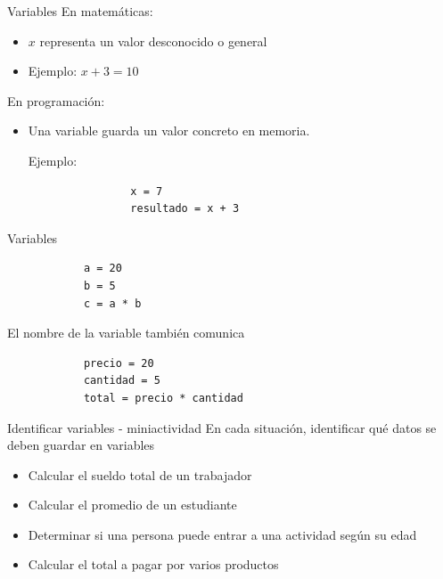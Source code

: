 \documentclass{beamer}
\begin{document}
    \begin{frame}[fragile,t]{Variables}
        En matemáticas:
        \begin{itemize}
            \item $x$ representa un valor desconocido o general
            \item Ejemplo: $x + 3 = 10$
        \end{itemize}
        En programación:
        \begin{itemize}
            \item Una variable guarda un valor concreto en memoria.
            
            Ejemplo:
            
            \begin{verbatim}
                x = 7
                resultado = x + 3
            \end{verbatim}
        \end{itemize}
    \end{frame}

    \begin{frame}[fragile,t]{Variables}
        \begin{verbatim}
            a = 20
            b = 5
            c = a * b
        \end{verbatim}
        
        El nombre de la variable también comunica
        
        \begin{verbatim}
            precio = 20
            cantidad = 5
            total = precio * cantidad
        \end{verbatim}
    \end{frame}

    \begin{frame}{Identificar variables - miniactividad}
        En cada situación, identificar qué datos se deben guardar en variables
        \begin{itemize}
            \item Calcular el sueldo total de un trabajador
            \item Calcular el promedio de un estudiante
            \item Determinar si una persona puede entrar a una actividad según su edad
            \item Calcular el total a pagar por varios productos
        \end{itemize}
    \end{frame}
\end{document}
